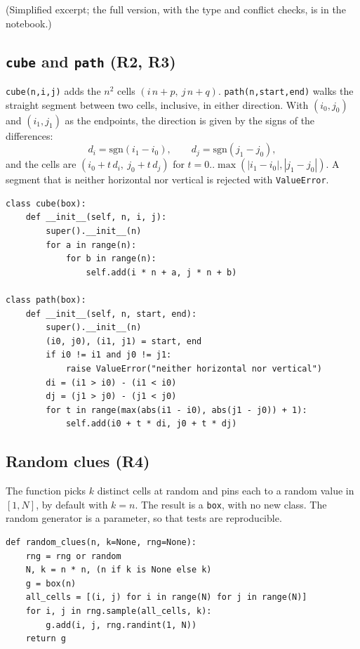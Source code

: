 \documentclass[11pt,a4paper]{article}
\begin{document}
(Simplified excerpt; the full version, with the type and conflict checks, is in the notebook.)

\subsection{\texttt{cube} and \texttt{path} (R2, R3)}

\texttt{cube(n,i,j)} adds the $n^2$ cells $(i\,n+p,\ j\,n+q)$. \texttt{path(n,start,end)} walks the straight segment between two cells, inclusive, in either direction. With $(i_0,j_0)$ and $(i_1,j_1)$ as the endpoints, the direction is given by the signs of the differences:
\[
  d_i=\mathrm{sgn}(i_1-i_0),\qquad d_j=\mathrm{sgn}(j_1-j_0),
\]
and the cells are $(i_0+t\,d_i,\ j_0+t\,d_j)$ for $t=0..\max(|i_1-i_0|,|j_1-j_0|)$. A segment that is neither horizontal nor vertical is rejected with \texttt{ValueError}.

\begin{lstlisting}
class cube(box):
    def __init__(self, n, i, j):
        super().__init__(n)
        for a in range(n):
            for b in range(n):
                self.add(i * n + a, j * n + b)

class path(box):
    def __init__(self, n, start, end):
        super().__init__(n)
        (i0, j0), (i1, j1) = start, end
        if i0 != i1 and j0 != j1:
            raise ValueError("neither horizontal nor vertical")
        di = (i1 > i0) - (i1 < i0)
        dj = (j1 > j0) - (j1 < j0)
        for t in range(max(abs(i1 - i0), abs(j1 - j0)) + 1):
            self.add(i0 + t * di, j0 + t * dj)
\end{lstlisting}

\subsection{Random clues (R4)}

The function picks $k$ distinct cells at random and pins each to a random value in $[1,N]$, by default with $k=n$. The result is a \texttt{box}, with no new class. The random generator is a parameter, so that tests are reproducible.

\begin{lstlisting}
def random_clues(n, k=None, rng=None):
    rng = rng or random
    N, k = n * n, (n if k is None else k)
    g = box(n)
    all_cells = [(i, j) for i in range(N) for j in range(N)]
    for i, j in rng.sample(all_cells, k):
        g.add(i, j, rng.randint(1, N))
    return g
\end{lstlisting}
\end{document}
